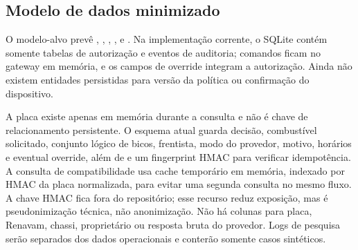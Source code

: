 \subsection{Modelo de dados minimizado}

O modelo-alvo prevê , ,
, ,  e
. Na implementação corrente, o SQLite contém somente tabelas
de autorização e eventos de auditoria; comandos ficam no gateway em memória, e
os campos de override integram a autorização. Ainda não existem entidades
persistidas para versão da política ou confirmação do dispositivo.

A placa existe apenas em memória durante a consulta e não é chave de
relacionamento persistente. O esquema atual guarda decisão, combustível
solicitado, conjunto lógico de bicos, frentista, modo do provedor, motivo,
horários e eventual override, além de  e um fingerprint HMAC para verificar
idempotência. A consulta de compatibilidade usa cache temporário em memória,
indexado por HMAC da placa normalizada, para evitar uma segunda consulta no
mesmo fluxo. A chave HMAC fica fora do repositório; esse recurso reduz exposição,
mas é pseudonimização técnica, não anonimização. Não há colunas para placa,
Renavam, chassi, proprietário ou resposta bruta do provedor. Logs de pesquisa
serão separados dos dados operacionais e conterão somente casos sintéticos.

